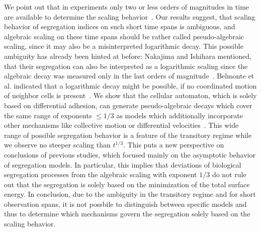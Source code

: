 \documentclass[10pt,letterpaper]{article}
\begin{document}
We point out that in experiments only two or less
orders of magnitudes in time are available to determine the scaling
behavior~\cite{MehMonNemVic2012, KriEtal2008, CocLocSteCol2017}.
Our results suggest, that scaling behavior of segregation indices on
such short time spans is ambiguous, and algebraic scaling on these
time spans should be rather called pseudo-algebraic scaling, since it
may also be a misinterpreted logarithmic decay. This possible
ambiguity has already been hinted at before: Nakajima and Ishihara
mentioned, that their segregation can also be interpreted as a
logarithmic scaling since the algebraic decay was measured only in the
last orders of magnitude~\cite{NakIsh2011}. Belmonte et al. indicated
that a logarithmic decay might be possible, if no coordinated motion
of neighbor cells is present~\cite{BelThoBruAlmCha2008}. We show that
the cellular automaton, which is solely based on differential
adhesion, can generate pseudo-algebraic decays which cover the same
range of exponents $\leq 1/3$ as models which additionally incorporate
other mechanisms like collective motion or differential
velocities~\cite{BelThoBruAlmCha2008, NakIsh2011, BeaBru2011,
  StrJuuBauKabDuk2014}. This wide range of possible segregation
behavior is a feature of the transitory regime while we
observe no steeper scaling than $t^{1/3}$. This puts a
new perspective on conclusions of previous studies, which focused
mainly on the asymptotic behavior of segregation models. In
particular, this implies that deviations of biological segregation
processes from the algebraic scaling with exponent $1/3$ do not rule
out that the segregation is solely based on the minimization of the
total surface energy. In conclusion, due to the ambiguity in the
transitory regime and for short observation spans, it is not possbile
to distinguish between specific models and thus to determine which
mechanisms govern the segregation solely based on the scaling
behavior.
\end{document}
